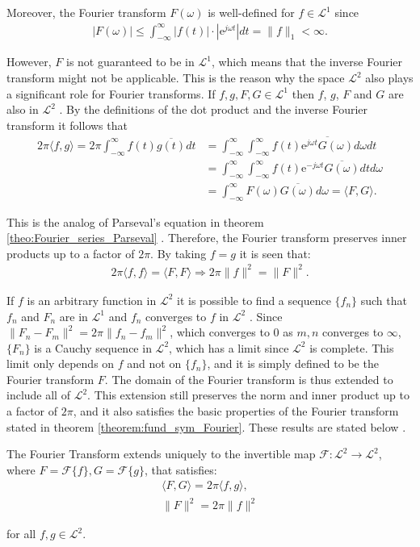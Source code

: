Moreover, the Fourier transform $F(\omega)$ is well-defined for $f \in \mathcal{L}^1$ since
\begin{align*}
|F(\omega)| \leq \int_{-\infty}^\infty |f(t)| \cdot |\text{e}^{j \omega t}| dt = \|f\|_{1} < \infty.
\end{align*}

However, $F$ is not guaranteed to be in $\mathcal{L}^1$, which means that the inverse Fourier transform might not be applicable. This is the reason why the space $\mathcal{L}^2$ also plays a significant role for Fourier transforms. If $f, g, F, G \in \mathcal{L}^1$ then $f$, $g$, $F$ and $G$ are also in $\mathcal{L}^2$ \cite{page 219, FAA}. By the definitions of the dot product and the inverse Fourier transform it follows that
\begin{align*}
2\pi \langle f,g \rangle = 2\pi \int_{-\infty}^\infty f(t) \overline{g(t)} dt &= \int_{-\infty}^\infty \int_{-\infty}^\infty f(t) \overline{\text{e}^{j\omega t} G(\omega)} d\omega dt \\
&= \int_{-\infty}^\infty \int_{-\infty}^\infty f(t) \text{e}^{-j\omega t} \overline{G(\omega)} dt d\omega \\
&= \int_{-\infty}^\infty F(\omega) \overline{G(\omega)} d\omega = \langle F,G \rangle.
\end{align*}

This is the analog of Parseval's equation in theorem \ref{theo:Fourier_series_Parseval} \cite{page 221, FAA}. Therefore, the Fourier transform preserves inner products up to a factor of $2\pi$. By taking $f = g$ it is seen that:
\begin{align*}
2\pi \langle f,f \rangle = \langle F,F \rangle \Rightarrow 2\pi \|f\|^2 = \|F\|^2.
\end{align*}

If $f$ is an arbitrary function in $\mathcal{L}^2$ it is possible to find a sequence $\{f_n\}$ such that $f_n$ and $F_n$ are in $\mathcal{L}^1$ and $f_n$ converges to $f$ in $\mathcal{L}^2$ \cite{page 82, FAA}. Since $\|F_n - F_m\|^2 = 2\pi\|f_n - f_m\|^2$, which converges to 0 as $m,n$ converges to $\infty$, $\{F_n\}$ is a Cauchy sequence in $\mathcal{L}^2$, which has a limit since $\mathcal{L}^2$ is complete. This limit only depends on $f$ and not on $\{f_n\}$, and it is simply defined to be the Fourier transform $F$. The domain of the Fourier transform is thus extended to include all of $\mathcal{L}^2$. This extension still preserves the norm and inner product up to a factor of $2\pi$, and it also satisfies the basic properties of the Fourier transform stated in theorem \ref{theorem:fund_sym_Fourier}. These results are stated below \cite{page 222, FAA}.

\begin{theorem} \label{theo:Plancherel}
The Fourier Transform extends uniquely to the invertible map $\mathcal{F}: \mathcal{L}^2 \to \mathcal{L}^2$, where $F = \mathcal{F}\{f\}, G = \mathcal{F}\{g\}$, that satisfies:
\begin{align*}
\langle F, G \rangle = 2\pi \langle f,g \rangle, \\
\|F\|^2  = 2\pi \|f\|^2
\end{align*}

for all $f,g \in \mathcal{L}^2$.
\end{theorem}